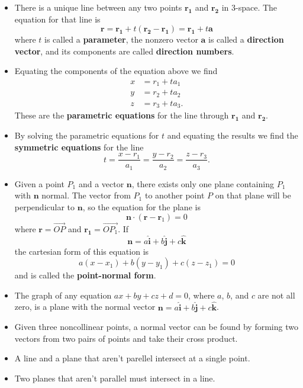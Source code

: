 \documentclass{article}
\begin{document}
\begin{itemize}
  \item There is a unique line between any two points $\mathbf{r_1}$ and $\mathbf{r_2}$ in 3-space. The equation for that line is \[\mathbf{r} = \mathbf{r_1} + t (\mathbf{r_2} - \mathbf{r_1}) = \mathbf{r_1} + t \mathbf{a}\] where $t$ is called a \textbf{parameter}, the nonzero vector $\mathbf{a}$ is called a \textbf{direction vector}, and its components are called \textbf{direction numbers}.

  \item Equating the components of the equation above we find \begin{align*}
          x & = r_1 + t a_1  \\
          y & = r_2 + t a_2  \\
          z & = r_3 + t a_3.
        \end{align*} These are the \textbf{parametric equations} for the line through $\mathbf{r_1}$ and $\mathbf{r_2}$.

  \item By solving the parametric equations for $t$ and equating the results we find the \textbf{symmetric equations} for the line \[t = \frac{x - r_1}{a_1} = \frac{y - r_2}{a_2} = \frac{z - r_3}{a_3}.\]

  \item Given a point $P_1$ and a vector $\mathbf{n}$, there exists only one plane containing $P_1$ with $\mathbf{n}$ normal. The vector from $P_1$ to another point $P$ on that plane will be perpendicular to $\mathbf{n}$, so the equation for the plane is \[\mathbf{n} \cdot (\mathbf{r} - \mathbf{r}_1) = 0\] where $\mathbf{r} = \overrightarrow{O P}$ and $\mathbf{r_1} = \overrightarrow{O P_1}$. If \[\mathbf{n} = a \hat{\mathbf{i}} + b \hat{\mathbf{j}} + c \hat{\mathbf{k}}\] the cartesian form of this equation is \[a (x - x_1) + b (y - y_1) + c (z - z_1) = 0\] and is called the \textbf{point-normal form}.

  \item The graph of any equation $a x + b y + c z + d = 0$, where $a$, $b$, and $c$ are not all zero, is a plane with the normal vector $\mathbf{n} = a \hat{\mathbf{i}} + b \hat{\mathbf{j}} + c \hat{\mathbf{k}}$.

  \item Given three noncollinear points, a normal vector can be found by forming two vectors from two pairs of points and take their cross product.

  \item A line and a plane that aren't parellel intersect at a single point.

  \item Two planes that aren't parallel must intersect in a line.
\end{itemize}
\end{document}
